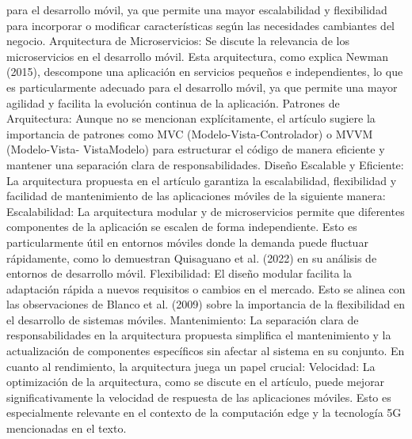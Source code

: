 \documentclass[12pt]{article}
\begin{document}
para el desarrollo móvil, ya que permite una mayor escalabilidad y flexibilidad para incorporar o modificar características según las necesidades cambiantes del negocio.
Arquitectura de Microservicios: Se discute la relevancia de los microservicios en el desarrollo móvil. Esta arquitectura, como explica Newman (2015), descompone una aplicación en servicios pequeños e independientes, lo que es particularmente adecuado para el desarrollo móvil, ya que permite una mayor agilidad y facilita la evolución continua de la aplicación.
Patrones de Arquitectura: Aunque no se mencionan explícitamente, el artículo sugiere la importancia de patrones como MVC (Modelo-Vista-Controlador) o MVVM (Modelo-Vista- VistaModelo) para estructurar el código de manera eficiente y mantener una separación clara de responsabilidades.
Diseño Escalable y Eficiente: La arquitectura propuesta en el artículo garantiza la escalabilidad, flexibilidad y facilidad de mantenimiento de las aplicaciones móviles de la siguiente manera:
Escalabilidad: La arquitectura modular y de microservicios permite que diferentes componentes de la aplicación se escalen de forma independiente. Esto es particularmente útil en entornos móviles donde la demanda puede fluctuar rápidamente, como lo demuestran Quisaguano et al. (2022) en su análisis de entornos de desarrollo móvil.
Flexibilidad: El diseño modular facilita la adaptación rápida a nuevos requisitos o cambios en el mercado. Esto se alinea con las observaciones de Blanco et al. (2009) sobre la importancia de la flexibilidad en el desarrollo de sistemas móviles.
Mantenimiento: La separación clara de responsabilidades en la arquitectura propuesta simplifica el mantenimiento y la actualización de componentes específicos sin afectar al sistema en su conjunto.
En cuanto al rendimiento, la arquitectura juega un papel crucial:
Velocidad: La optimización de la arquitectura, como se discute en el artículo, puede mejorar significativamente la velocidad de respuesta de las aplicaciones móviles. Esto es especialmente relevante en el contexto de la computación edge y la tecnología 5G mencionadas en el texto.
 
\end{document}
